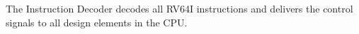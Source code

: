 The Instruction Decoder decodes all RV64I instructions and delivers the control signals to all design elements in the CPU.



